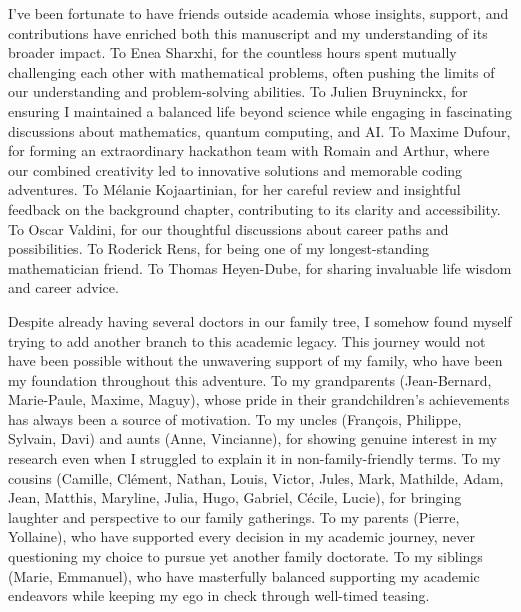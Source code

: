 I've been fortunate to have friends outside academia whose insights, support, and contributions have enriched both this manuscript and my understanding of its broader impact.\n
To Enea Sharxhi, for the countless hours spent mutually challenging each other with mathematical problems, often pushing the limits of our understanding and problem-solving abilities.\n
To Julien Bruyninckx, for ensuring I maintained a balanced life beyond science while engaging in fascinating discussions about mathematics, quantum computing, and AI.\n
To Maxime Dufour, for forming an extraordinary hackathon team with Romain and Arthur, where our combined creativity led to innovative solutions and memorable coding adventures.\n
To Mélanie Kojaartinian, for her careful review and insightful feedback on the background chapter, contributing to its clarity and accessibility.\n
To Oscar Valdini, for our thoughtful discussions about career paths and possibilities.\n
To Roderick Rens, for being one of my longest-standing mathematician friend.\n
To Thomas Heyen-Dube, for sharing invaluable life wisdom and career advice.\n


Despite already having several doctors in our family tree, I somehow found myself trying to add another branch to this academic legacy.
This journey would not have been possible without the unwavering support of my family, who have been my foundation throughout this adventure.\n
To my grandparents (Jean-Bernard, Marie-Paule, Maxime, Maguy), whose pride in their grandchildren's achievements has always been a source of motivation.\n
To my uncles (François, Philippe, Sylvain, Davi) and aunts (Anne, Vincianne), for showing genuine interest in my research even when I struggled to explain it in non-family-friendly terms.\n
To my cousins (Camille, Clément, Nathan, Louis, Victor, Jules, Mark, Mathilde, Adam, Jean, Matthis, Maryline, Julia, Hugo, Gabriel, Cécile, Lucie), for bringing laughter and perspective to our family gatherings.\n
To my parents (Pierre, Yollaine), who have supported every decision in my academic journey, never questioning my choice to pursue yet another family doctorate.\n
To my siblings (Marie, Emmanuel), who have masterfully balanced supporting my academic endeavors while keeping my ego in check through well-timed teasing.\n


